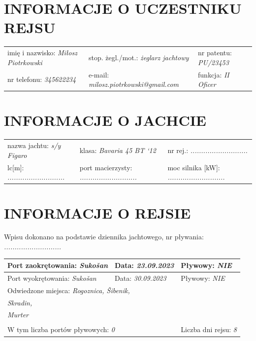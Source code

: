 \documentclass{article}
\begin{document}
\section*{INFORMACJE O UCZESTNIKU REJSU}
\begin{tabularx}{\textwidth}{X X X}
imię i nazwisko: \textit{Miłosz Piotrkowski} & stop. żegl./mot.: \textit{żeglarz jachtowy} & nr patentu: \textit{PU/23453} \\
nr telefonu: \textit{345622234} & e-mail: \textit{milosz.piotrkowski@gmail.com} & funkcja: \textit{II Oficer} \\
\end{tabularx}

\section*{INFORMACJE O JACHCIE}

\begin{tabularx}{\textwidth}{X X X}
nazwa jachtu: \textit{s/y Figaro} & klasa: \textit{Bavaria 45 BT ‘12} & nr rej.: \textit{...........................} \\
lc[m]: \textit{...........................} & port macierzysty: \textit{...........................} & moc silnika [kW]: \textit{...........................} \\
\end{tabularx}

\section*{INFORMACJE O REJSIE}

Wpisu dokonano na podstawie dziennika jachtowego, nr pływania: \textit{...........................}
\\

\begin{tabularx}{\textwidth}{|X|X|X|}
\hline
Port zaokrętowania: \textit{Sukošan} & Data: \textit{23.09.2023} & Pływowy: \textit{NIE} \\
\hline
Port wyokrętowania: \textit{Sukošan} & Data: \textit{30.09.2023} & Pływowy: \textit{NIE} \\
\hline
\multicolumn{3}{|l|}{Odwiedzone miejsca:
\textit{Rogoznica, Šibenik,}\dotfill}\\
\multicolumn{3}{|l|}{\textit{ Skradin,}\dotfill} \\
\multicolumn{3}{|l|}{\textit{ Murter}\dotfill} \\
\multicolumn{3}{|l|}{\dotfill} \\
\hline
\multicolumn{2}{|l|}{W tym liczba portów pływowych: \textit{0}} & Liczba dni rejsu: \textit{8}\\
\hline
\end{tabularx}
\\\\
\end{document}
